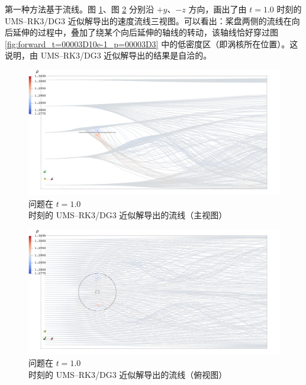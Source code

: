 第一种方法基于流线。图 \ref{fig:forward_wake_y_view}、图 \ref{fig:forward_wake_z_view}
分别沿 $+y$、$-z$ 方向，画出了由 $t=1.0$ 时刻的 UMS–RK3/DG3 近似解导出的速度流线三视图。可以看出：桨盘两侧的流线在向后延伸的过程中，叠加了绕某个向后延伸的轴线的转动，该轴线恰好穿过图
\ref{fig:forward_t=00003D10e-1_p=00003D3} 中的低密度区（即涡核所在位置）。这说明，由 UMS–RK3/DG3
近似解导出的结果是自洽的。

\begin{figure}[h!]
\begin{centering}
\includegraphics[width=1\textwidth,height=0.28\textheight,keepaspectratio]{figures/forward/p=3/y+}
\par\end{centering}
\caption{\label{fig:forward_wake_y_view}问题在
$t=1.0$ 时刻的 UMS–RK3/DG3 近似解导出的流线（主视图）}
\end{figure}

\begin{figure}[h!]
\begin{centering}
\includegraphics[width=1\textwidth,height=0.28\textheight,keepaspectratio]{figures/forward/p=3/z-}
\par\end{centering}
\caption{\label{fig:forward_wake_z_view}问题在
$t=1.0$ 时刻的 UMS–RK3/DG3 近似解导出的流线（俯视图）}
\end{figure}

